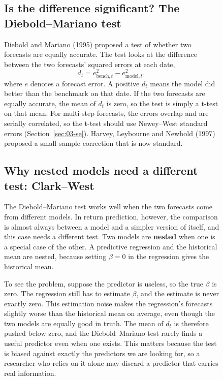 \begin{figure}[htbp]
\subsection{Is the difference significant? The Diebold--Mariano test}

Diebold and Mariano (1995) proposed a test of whether two forecasts are equally accurate. The test looks at the difference between the two forecasts' squared errors at each date,
\begin{equation}
  d_t = e^2_{\text{bench},t} - e^2_{\text{model},t},
  \label{eq:05-dm}
\end{equation}
where $e$ denotes a forecast error. A positive $d_t$ means the model did better than the benchmark on that date. If the two forecasts are equally accurate, the mean of $d_t$ is zero, so the test is simply a t-test on that mean. For multi-step forecasts, the errors overlap and are serially correlated, so the t-test should use Newey--West standard errors (Section~\ref{sec:03-se}). Harvey, Leybourne and Newbold (1997) proposed a small-sample correction that is now standard.

\subsection{Why nested models need a different test: Clark--West}

The Diebold--Mariano test works well when the two forecasts come from different models. In return prediction, however, the comparison is almost always between a model and a simpler version of itself, and this case needs a different test. Two models are \textbf{nested} when one is a special case of the other. A predictive regression and the historical mean are nested, because setting $\beta = 0$ in the regression gives the historical mean.

To see the problem, suppose the predictor is useless, so the true $\beta$ is zero. The regression still has to estimate $\beta$, and the estimate is never exactly zero. This estimation noise makes the regression's forecasts slightly worse than the historical mean on average, even though the two models are equally good in truth. The mean of $d_t$ is therefore pushed below zero, and the Diebold--Mariano test rarely finds a useful predictor even when one exists. This matters because the test is biased against exactly the predictors we are looking for, so a researcher who relies on it alone may discard a predictor that carries real information.


\end{figure}
